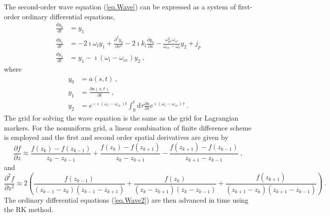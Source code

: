 The second-order wave equation (\ref{eq.Wave}) can be expressed as a system of first-order ordinary differential equations,
\begin{equation}\label{eq.Wave2}
    \begin{aligned}
        \frac{d y_0}{d t} & = y_1 %
        \\
        \frac{d y_1}{d t} & =-2 \imath \omega_l y_1+\frac{\partial^2 y_0}{\partial s^2}-2 \imath k_l \frac{\partial y_0}{\partial s}- \frac{\omega_{pe}^2\omega_{ce}}{\omega_{ce}-\omega_l}y_{2} +j_p\\
        \frac{d y_2}{d t} & =y_1-\imath\left(\omega_l-\omega_{ce}\right) y_2~,
        \end{aligned}
\end{equation}
where 
\begin{equation}
    \begin{aligned}
        y_0 &= a(s,t)~,
        \\
        y_1 &= \frac{\partial a(s,t)}{\partial t}~,
        \\
        y_2 &= e^{-\imath(\omega_l-\omega_{ce})t} \int_0^t\mathrm{d}\tau \frac{\partial a}{\partial \tau} e^{\imath(\omega_l-\omega_{ce})\tau}~.
    \end{aligned}
\end{equation}
The grid for solving the wave equation is the same as the grid for Lagrangian markers.
For the nonuniform grid, 
a linear combination of finite difference scheme is employed and the first and second order spatial derivatives are given by 
\begin{equation}
    \frac{\partial f}{\partial z} \approx \frac{f(z_k) - f(z_{k-1})}{z_k-z_{k-1}} + \frac{f(z_k) - f(z_{k+1})}{z_k - z_{k+1}} - \frac{f(z_{k+1}) - f(z_{k-1})}{z_{k+1} - z_{k-1}}~,
\end{equation}
and
\begin{equation}
    \frac{\partial^2 f}{\partial z^2} \approx 2 \left(\frac{f(z_{k-1})}{(z_{k-1}-z_{k})(z_{k-1}-z_{k+1})}+\frac{f(z_{k})}{(z_k-z_{k+1})(z_k-z_{k-1})}+\frac{f(z_{k+1})}{(z_{k+1}-z_{k})(z_{k+1}-z_{k-1})}\right)~.
\end{equation}
The ordinary differential equations (\ref{eq.Wave2}) 
are then advanced in time using the RK method.

